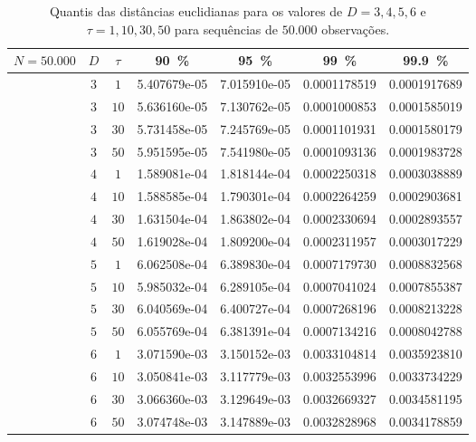 \begin{table}[hbt]
	\centering
	\caption{Quantis das distâncias euclidianas para os valores de $D= 3, 4, 5, 6$ e $\tau=1, 10, 30, 50$ para sequências de $50.000$ observações.}\label{tab:dEuclid_50k}
	\begin{tabular}{ccccccc}
		\toprule
$N = 50.000$	&  $D$  &$\tau$  &\SI{90}{\percent}&\SI{95}{\percent}&\SI{99}{\percent}&\SI{99.9}{\percent}\\ 
\midrule
				&  $3$  &  $ 1$  &  5.407679e-05  &  7.015910e-05  &  0.0001178519  &  0.0001917689 \\ 
				&  $3$  &  $10$  &  5.636160e-05  &  7.130762e-05  &  0.0001000853  &  0.0001585019 \\
				&  $3$  &  $30$  &  5.731458e-05  &  7.245769e-05  &  0.0001101931  &  0.0001580179 \\
				&  $3$  &  $50$  &  5.951595e-05  &  7.541980e-05  &  0.0001093136  &  0.0001983728 \\ 
\midrule
				&  $4$  &  $ 1$  &  1.589081e-04  &  1.818144e-04  &  0.0002250318  &  0.0003038889 \\ 
				&  $4$  &  $10$  &  1.588585e-04  &  1.790301e-04  &  0.0002264259  &  0.0002903681 \\
				&  $4$  &  $30$  &  1.631504e-04  &  1.863802e-04  &  0.0002330694  &  0.0002893557 \\
				&  $4$  &  $50$  &  1.619028e-04  &  1.809200e-04  &  0.0002311957  &  0.0003017229 \\ 
\midrule
				&  $5$  &  $ 1$  &  6.062508e-04  &  6.389830e-04  &  0.0007179730  &  0.0008832568 \\ 
				&  $5$  &  $10$  &  5.985032e-04  &  6.289105e-04  &  0.0007041024  &  0.0007855387 \\
				&  $5$  &  $30$  &  6.040569e-04  &  6.400727e-04  &  0.0007268196  &  0.0008213228 \\
				&  $5$  &  $50$  &  6.055769e-04  &  6.381391e-04  &  0.0007134216  &  0.0008042788 \\ 
\midrule
				&  $6$  &  $ 1$  &  3.071590e-03  &  3.150152e-03  &  0.0033104814  &  0.0035923810 \\ 
				&  $6$  &  $10$  &  3.050841e-03  &  3.117779e-03  &  0.0032553996  &  0.0033734229 \\
				&  $6$  &  $30$  &  3.066360e-03  &  3.129649e-03  &  0.0032669327  &  0.0034581195 \\
				&  $6$  &  $50$  &  3.074748e-03  &  3.147889e-03  &  0.0032828968  &  0.0034178859 \\
		\bottomrule
	\end{tabular}
\end{table}